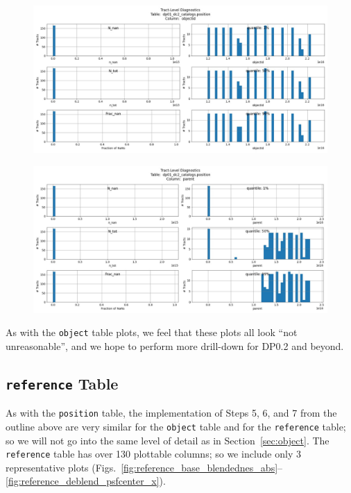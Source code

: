 \documentclass[DM,authoryear,toc]{lsstdoc}
\begin{document}
\begin{figure}[h]
\centering
\includegraphics[width=1.0\linewidth]{Plots/TAP_verify_DP01.dp01_dc2_catalogs.position.objectId.pdf}
\caption{}
\label{fig:position_objectId}
\end{figure}

\begin{figure}[h]
\centering
\includegraphics[width=1.0\linewidth]{Plots/TAP_verify_DP01.dp01_dc2_catalogs.position.parent.pdf}
\caption{}
\label{fig:position_parent}
\end{figure}


As with the \texttt{object} table plots, we feel that these plots all
look ``not unreasonable'', and we hope to perform more drill-down for
DP0.2 and beyond.





\subsection{\texttt{reference} Table} \label{sec:reference}

As with the \texttt{position} table, the implementation of Steps 5, 6,
and 7 from the outline above are very similar for the \texttt{object}
table and for the \texttt{reference} table; so we will not go into the
same level of detail as in Section~\ref{sec:object}.  The
\texttt{reference} table has over 130 plottable columns; so we
include only 3 representative plots
(Figs.~\ref{fig:reference_base_blendednes_abs}--\ref{fig:reference_deblend_psfcenter_x}).
\end{document}
